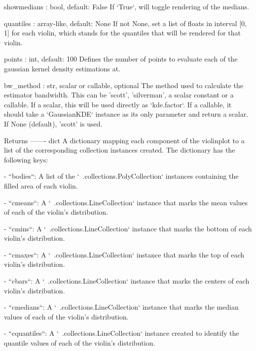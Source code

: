 \begin{DoxyVerb}
\begin{DoxyVerb}
showmedians : bool, default: False
  If `True`, will toggle rendering of the medians.

quantiles : array-like, default: None
  If not None, set a list of floats in interval [0, 1] for each violin,
  which stands for the quantiles that will be rendered for that
  violin.

points : int, default: 100
  Defines the number of points to evaluate each of the
  gaussian kernel density estimations at.

bw_method : str, scalar or callable, optional
  The method used to calculate the estimator bandwidth.  This can be
  'scott', 'silverman', a scalar constant or a callable.  If a
  scalar, this will be used directly as `kde.factor`.  If a
  callable, it should take a `GaussianKDE` instance as its only
  parameter and return a scalar. If None (default), 'scott' is used.

Returns
-------
dict
  A dictionary mapping each component of the violinplot to a
  list of the corresponding collection instances created. The
  dictionary has the following keys:

  - ``bodies``: A list of the `~.collections.PolyCollection`
    instances containing the filled area of each violin.

  - ``cmeans``: A `~.collections.LineCollection` instance that marks
    the mean values of each of the violin's distribution.

  - ``cmins``: A `~.collections.LineCollection` instance that marks
    the bottom of each violin's distribution.

  - ``cmaxes``: A `~.collections.LineCollection` instance that marks
    the top of each violin's distribution.

  - ``cbars``: A `~.collections.LineCollection` instance that marks
    the centers of each violin's distribution.

  - ``cmedians``: A `~.collections.LineCollection` instance that
    marks the median values of each of the violin's distribution.

  - ``cquantiles``: A `~.collections.LineCollection` instance created
    to identify the quantile values of each of the violin's
    distribution.\end{DoxyVerb}
 \mbox{\label{classmatplotlib_1_1axes_1_1__axes_1_1Axes_abcd79168e1e7e38f18c4d4b276dcd441}} 

\end{DoxyVerb}
